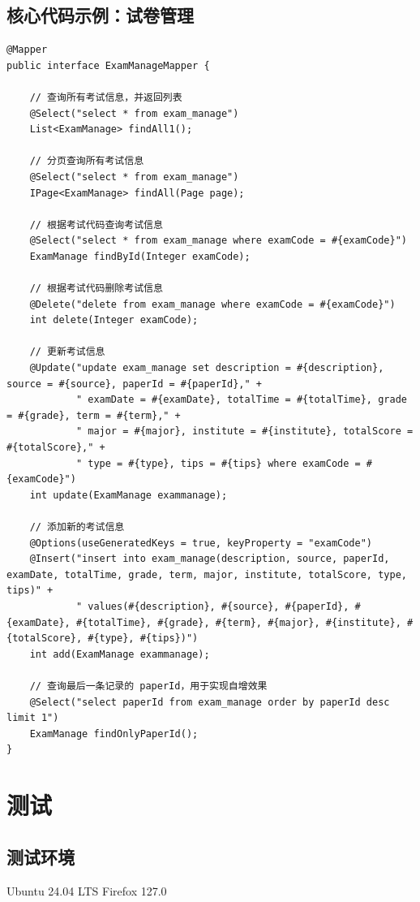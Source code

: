 \documentclass{article}
\begin{document}
\subsection{核心代码示例：试卷管理}

\begin{lstlisting}
@Mapper
public interface ExamManageMapper {

    // 查询所有考试信息，并返回列表
    @Select("select * from exam_manage")
    List<ExamManage> findAll1();

    // 分页查询所有考试信息
    @Select("select * from exam_manage")
    IPage<ExamManage> findAll(Page page);

    // 根据考试代码查询考试信息
    @Select("select * from exam_manage where examCode = #{examCode}")
    ExamManage findById(Integer examCode);

    // 根据考试代码删除考试信息
    @Delete("delete from exam_manage where examCode = #{examCode}")
    int delete(Integer examCode);

    // 更新考试信息
    @Update("update exam_manage set description = #{description}, source = #{source}, paperId = #{paperId}," +
            " examDate = #{examDate}, totalTime = #{totalTime}, grade = #{grade}, term = #{term}," +
            " major = #{major}, institute = #{institute}, totalScore = #{totalScore}," +
            " type = #{type}, tips = #{tips} where examCode = #{examCode}")
    int update(ExamManage exammanage);

    // 添加新的考试信息
    @Options(useGeneratedKeys = true, keyProperty = "examCode")
    @Insert("insert into exam_manage(description, source, paperId, examDate, totalTime, grade, term, major, institute, totalScore, type, tips)" +
            " values(#{description}, #{source}, #{paperId}, #{examDate}, #{totalTime}, #{grade}, #{term}, #{major}, #{institute}, #{totalScore}, #{type}, #{tips})")
    int add(ExamManage exammanage);

    // 查询最后一条记录的 paperId，用于实现自增效果
    @Select("select paperId from exam_manage order by paperId desc limit 1")
    ExamManage findOnlyPaperId();
}
\end{lstlisting}

\section{测试}

\subsection{测试环境}
Ubuntu 24.04 LTS
Firefox 127.0
\end{document}
